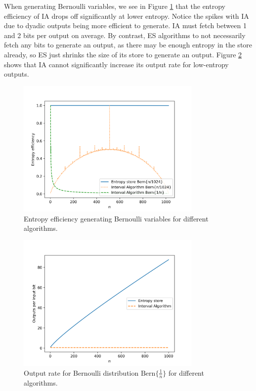 \documentclass[lettersize,onecolumn]{IEEEtran}
\newcommand{\bern}[1]{\mathrm{Bern}\{#1\}}
\begin{document}
When generating Bernoulli variables, we see in Figure \ref{fig:bernoulli-efficiency} that the entropy efficiency of IA drops off significantly at lower entropy. Notice the spikes with IA due to dyadic outputs being more efficient to generate. IA must fetch between 1 and 2 bits per output on average. By contrast, ES algorithms to not necessarily fetch any bits to generate an output, as there may be enough entropy in the store already, so ES just shrinks the size of its store to generate an output. Figure \ref{fig:bernoulli-rate} shows that IA cannot significantly increase its output rate for low-entropy outputs.

\begin{figure}[ht]
\centering
\includegraphics[width=0.8\textwidth]{bernoulli_efficiency.png}
\caption{Entropy efficiency generating Bernoulli variables for different algorithms.}
\label{fig:bernoulli-efficiency}
\end{figure}

\begin{figure}[ht]
\centering
\includegraphics[width=0.8\textwidth]{bernoulli_rate.png}
\caption{Output rate for Bernoulli distribution $\bern{\frac{1}{n}}$ for different algorithms.}
\label{fig:bernoulli-rate}
\end{figure}
\end{document}
